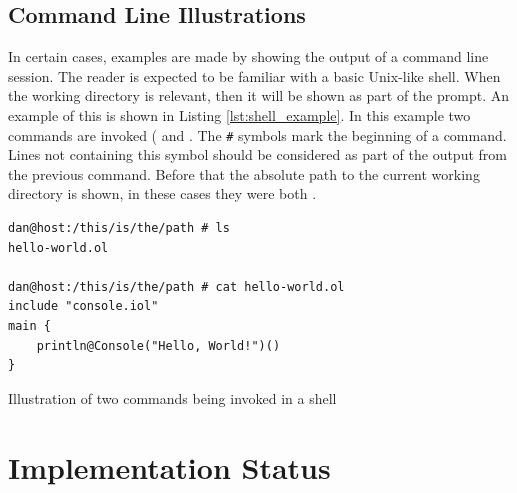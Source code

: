 \subsection*{Command Line Illustrations}

In certain cases, examples are made by showing the output of a command line
session. The reader is expected to be familiar with a basic Unix-like shell.
When the working directory is relevant, then it will be shown as part of the
prompt. An example of this is shown in Listing \ref{lst:shell_example}.  In
this example two commands are invoked ( and .
The \verb!#! symbols mark the beginning of a command. Lines not
containing this symbol should be considered as part of the output from
the previous command. Before that the absolute path to the current
working directory is shown, in these cases they were both
.

\begin{listing}[H]
\begin{verbatim}
dan@host:/this/is/the/path # ls
hello-world.ol

dan@host:/this/is/the/path # cat hello-world.ol
include "console.iol"
main {
    println@Console("Hello, World!")()
}
\end{verbatim}
\caption{Illustration of two commands being invoked in a shell}
\label{lst:shell_example}
\end{listing}

\section{Implementation Status}

